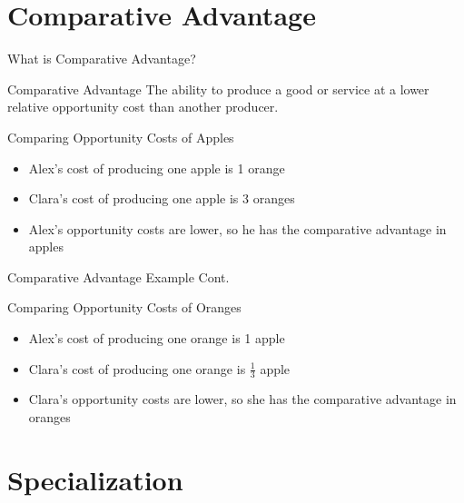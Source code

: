 \documentclass{beamer}
\begin{document}
\section{Comparative Advantage}

\begin{frame}{What is Comparative Advantage?}

\begin{block}{Comparative Advantage}
The ability to produce a good or service at a lower relative opportunity cost than another producer.
\end{block}

\begin{exampleblock}{Comparing Opportunity Costs of Apples}

\begin{itemize}
\item Alex's cost of producing one apple is 1 orange
\item Clara's cost of producing one apple is 3 oranges
\item Alex's opportunity costs are lower, so he has the comparative advantage in apples

\end{itemize}
\end{exampleblock}


\end{frame}

\begin{frame}{Comparative Advantage Example Cont.}

\begin{exampleblock}{Comparing Opportunity Costs of Oranges}

\begin{itemize}
\item Alex's cost of producing one orange is 1 apple
\item Clara's cost of producing one orange is $\frac{1}{3}$ apple
\item Clara's opportunity costs are lower, so she has the comparative advantage in oranges

\end{itemize}
\end{exampleblock}
\end{frame}



\section{Specialization}
\end{document}
